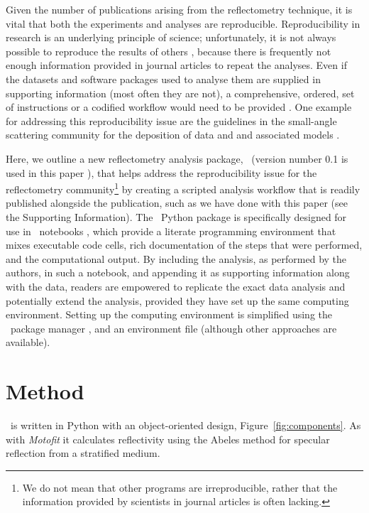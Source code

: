 \documentclass[pdf,preprint]{iucr}
\begin{document}
Given the number of publications arising from the reflectometry technique, it is vital that both the experiments and analyses are reproducible.
Reproducibility in research is an underlying principle of science; unfortunately, it is not always possible to reproduce the results of others \cite{Stark2018}, because there is frequently not enough information provided in journal articles to repeat the analyses. Even if the datasets and software packages used to analyse them are supplied in supporting information (most often they are not), a comprehensive, ordered, set of instructions or a codified workflow would need to be provided \cite{Moeller2017a}.
One example for addressing this reproducibility issue are the guidelines in the small-angle scattering community for the deposition of data and and associated models \cite{Trewhella:jc5010}.

Here, we outline a new reflectometry analysis package, \ (version number 0.1 is used in this paper \cite{refnx}), that helps address the reproducibility issue for the reflectometry community\footnote{We do not mean that other programs are irreproducible, rather that the information provided by scientists in journal articles is often lacking.} by creating a scripted analysis workflow that is readily published alongside the publication, such as we have done with this paper (see the Supporting Information).
The \ Python package is specifically designed for use in \Jupyter\ notebooks \cite{Kluyver:2016aa}, which provide a literate programming environment that mixes executable code cells, rich documentation of the steps that were performed, and the computational output. By including the analysis, as performed by the authors, in such a notebook, and appending it as supporting information along with the data, readers are empowered to replicate the exact data analysis and potentially extend the analysis, provided they have set up the same computing environment. Setting up the computing environment is simplified using the \conda\ package manager \cite{conda}, and an environment file (although other approaches are available).

\section{Method}

\ is written in Python with an object-oriented design, Figure~\ref{fig:components}. As with \emph{Motofit} \cite{Nelson2006} it calculates reflectivity using the Abeles method \cite{Heavens1955} for specular reflection from a stratified medium.
\end{document}
